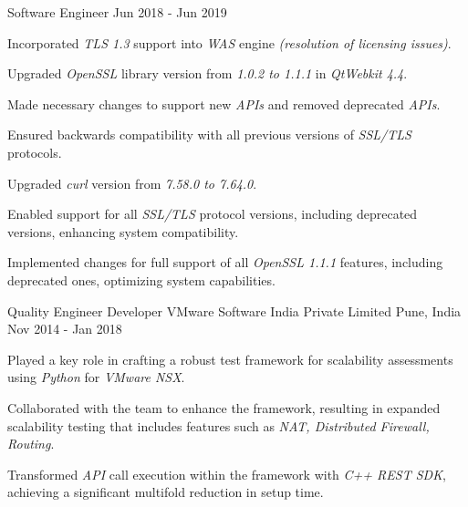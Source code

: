 \begin{cventries}
\cventry
{Software Engineer} %
{} %
{} %
{Jun 2018 - Jun 2019} %
{
\begin{cvitems}
\setlength{\itemsep}{1ex} %
%
\item {Incorporated \textit{TLS 1.3} support into \textit{WAS} engine \textit{(resolution of licensing issues)}.}
	\begin{cvitemsnested}
		\item {Upgraded \textit{OpenSSL} library version from \textit{1.0.2 to 1.1.1} in \textit{QtWebkit 4.4}.}
		\item {Made necessary changes to support new \textit{APIs} and removed deprecated \textit{APIs}.}
		\item {Ensured backwards compatibility with all previous versions of \textit{SSL/TLS} protocols.}
	\end{cvitemsnested}
\item {Upgraded \textit{curl} version from \textit{7.58.0 to 7.64.0}.}
	\begin{cvitemsnested}
		\item {Enabled support for all \textit{SSL/TLS} protocol versions, including deprecated versions, enhancing system compatibility.}
		\item {Implemented changes for full support of all \textit{OpenSSL 1.1.1} features, including deprecated ones, optimizing system capabilities.}
	\end{cvitemsnested}
%
\end{cvitems}
}


\cventry
{Quality Engineer Developer} %
{VMware Software India Private Limited} %
{Pune, India} %
{Nov 2014 - Jan 2018} %
{ %
\begin{cvitems}
\item {Played a key role in crafting a robust test framework for scalability assessments using \textit{Python} for \textit{VMware NSX}.}
\item {Collaborated with the team to enhance the framework, resulting in expanded scalability testing that includes features such as \textit{NAT, Distributed Firewall, Routing}.}
\item {Transformed \textit{API} call execution within the framework with \textit{C++ REST SDK}, achieving a significant multifold reduction in setup time.}
\end{cvitems}
}


\end{cventries}
